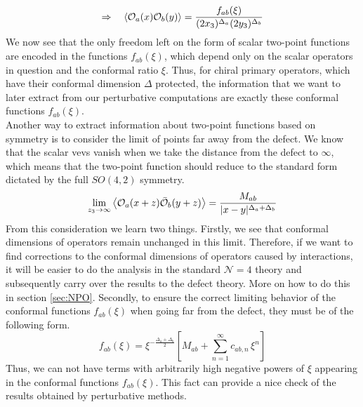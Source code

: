 %
%
\begin{equation}
\Rightarrow \quad
%
\expval{\mathcal{O}_a(x) \mathcal{O}_b(y)}
=
\frac{f_{ab}(\xi)}{(2 x_3)^{\Delta_a} (2 y_3)^{\Delta_b}}
\end{equation}
%
%
We now see that the only freedom left on the form of scalar two-point functions are encoded in the functions $f_{ab}(\xi)$, which depend only on the scalar operators in question and the conformal ratio $\xi$. Thus, for chiral primary operators, which have their conformal dimension $\Delta$ protected, the information that we want to later extract from our perturbative computations are exactly these conformal functions $f_{ab}(\xi)$.\\
Another way to extract information about two-point functions based on symmetry is to consider the limit of points far away from the defect. We know that the scalar vevs vanish when we take the distance from the defect to $\infty$, which means that the two-point function should reduce to the standard form dictated by the full $SO(4,2)$ symmetry.
%
%
\begin{equation}
\lim_{z_3 \to \infty} \expval{\mathcal{O}_a(x+z) \bar{\mathcal{O}}_b(y+z)}
=
\frac{M_{ab}}{|x-y|^{\Delta_a + \Delta_b}}
\end{equation}
%
%
From this consideration we learn two things. Firstly, we see that conformal dimensions of operators remain unchanged in this limit. Therefore, if we want to find corrections to the conformal dimensions of operators caused by interactions, it will be easier to do the analysis in the standard $\mathcal{N}=4$ theory and subsequently carry over the results to the defect theory. More on how to do this in section \ref{sec:NPO}. Secondly, to ensure the correct limiting behavior of the conformal functions $f_{ab}(\xi)$ when going far from the defect, they must be of the following form.
%
%
\begin{equation}
f_{ab}(\xi) = \xi^{-\frac{\Delta_a + \Delta_b}{2}} \left[
M_{ab} + \sum_{n=1}^\infty c_{ab,n} \, \xi^n
\right]
\end{equation}
%
%
Thus, we can not have terms with arbitrarily high negative powers of $\xi$ appearing in the conformal functions $f_{ab}(\xi)$. This fact can provide a nice check of the results obtained by perturbative methods.

